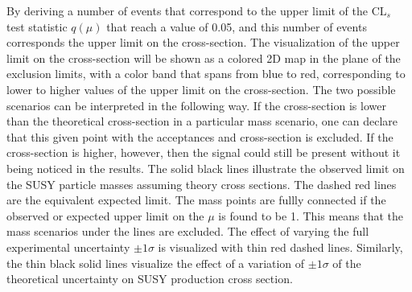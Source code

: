 By deriving a number of events that correspond to the upper limit of the $\mathrm{CL}_{s}$ test statistic $q(\mu)$ that reach a value of 0.05, and this number of events corresponds the upper limit on the cross-section. 
The visualization of the upper limit on the cross-section will be shown as a colored 2D map in the plane of the exclusion limits, with a color band that spans from blue to red, corresponding to lower to higher values of the upper limit on the cross-section.  
The two possible scenarios can be interpreted in the following way.  
If the cross-section is lower than the theoretical cross-section in a particular mass scenario, one can declare that this given point with the acceptances and cross-section is excluded.
If the cross-section is higher, however, then the signal could still be present without it being noticed in the results.
The solid black lines illustrate the observed limit on the SUSY particle masses assuming theory cross sections.
The dashed red lines are the equivalent expected limit.
The mass points are fullly connected if the observed or expected upper limit on the $\mu$ is found to be 1.
This means that the mass scenarios under the lines are excluded.
The effect of varying the full experimental uncertainty $\pm 1 \sigma$ is visualized with thin red dashed lines.
Similarly, the thin black solid lines visualize the effect of a variation of $\pm 1 \sigma$ of the theoretical uncertainty on SUSY production cross section.
